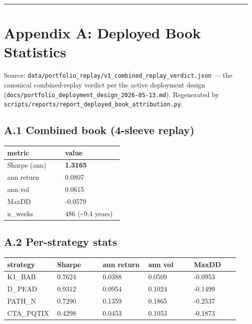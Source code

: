 \documentclass[11pt,a4paper]{article}
\begin{document}
\medskip\hrule\medskip

\section{Appendix A: Deployed Book Statistics}

Source: \texttt{data/portfolio\_replay/v1\_combined\_replay\_verdict.json} — the canonical combined-replay verdict per the active deployment design (\texttt{docs/portfolio\_deployment\_design\_2026-05-13.md}). Regenerated by \texttt{scripts/reports/report\_deployed\_book\_attribution.py}.

\subsection{A.1 Combined book (4-sleeve replay)}

\begin{center}
\small
\begin{tabular}{p{0.475\linewidth}p{0.475\linewidth}}
\toprule
\textbf{metric} & \textbf{value} \\
\midrule
Sharpe (ann) & \textbf{1.3165} \\
ann return & 0.0807 \\
ann vol & 0.0615 \\
MaxDD & -0.0579 \\
n\_weeks & 486 (\textasciitilde{}9.4 years) \\
\bottomrule
\end{tabular}
\end{center}

\subsection{A.2 Per-strategy stats}

\begin{center}
\small
\begin{tabular}{p{0.190\linewidth}p{0.190\linewidth}p{0.190\linewidth}p{0.190\linewidth}p{0.190\linewidth}}
\toprule
\textbf{strategy} & \textbf{Sharpe} & \textbf{ann return} & \textbf{ann vol} & \textbf{MaxDD} \\
\midrule
K1\_BAB & 0.7624 & 0.0388 & 0.0509 & -0.0953 \\
D\_PEAD & 0.9312 & 0.0954 & 0.1024 & -0.1499 \\
PATH\_N & 0.7290 & 0.1359 & 0.1865 & -0.2537 \\
CTA\_PQTIX & 0.4298 & 0.0453 & 0.1053 & -0.1873 \\
\bottomrule
\end{tabular}
\end{center}
\end{document}
